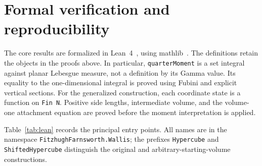 \documentclass[11pt]{article}
\numberwithin{equation}{section}
\theoremstyle{remark}
\newcommand{\lean}[1]{{\footnotesize\nolinkurl{#1}}}
\begin{document}
\section{Formal verification and reproducibility}
\label{sec:formalization}

The core results are formalized in Lean~4~\cite{Lean4}, using
mathlib~\cite{Mathlib}. The definitions retain the objects in the
proofs above. In particular, \lean{quarterMoment} is a set integral
against planar Lebesgue measure, not a definition by its Gamma
value. Its equality to the one-dimensional integral is proved
using Fubini and explicit vertical sections.
For the generalized construction, each coordinate state is a
function on \lean{Fin N}. Positive side lengths, intermediate
volume, and the volume-one attachment equation are proved
before the moment interpretation is applied.

Table~\ref{tab:lean} records the principal entry points. All names
are in the namespace \lean{FitzhughFarnsworth.Wallis}; the prefixes
\lean{Hypercube} and \lean{ShiftedHypercube} distinguish the original
and arbitrary-starting-volume constructions.
\end{document}
